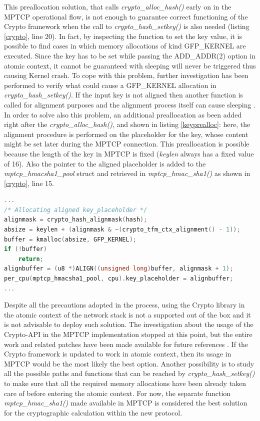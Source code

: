 This preallocation solution, that calls \textit{crypto\_alloc\_hash()} early on in the MPTCP operational flow, is not enough to guarantee correct functioning of the Crypto framework when the call to \textit{crypto\_hash\_setkey()} is also needed (listing \ref{crypto}, line 20). In fact, by inspecting the function to set the key value, it is possible to find cases in which memory allocations of kind GFP\_KERNEL are executed. Since the key has to be set while passing the ADD\_ADDR(2) option in atomic context, it cannot be guaranteed with sleeping will never be triggered thus causing Kernel crash. To cope with this problem, further investigation has been performed to verify what could cause a GFP\_KERNEL allocation in \textit{crypto\_hash\_setkey()}. If the input key is not aligned then another function \cite{shash61} is called for alignment purposes and the alignment process itself can cause sleeping \cite{shash43}. In order to solve also this problem, an additional preallocation as been added right after the  \textit{crypto\_alloc\_hash()}, and shown in listing \ref{keyprealloc}: here, the alignment procedure is performed on the placeholder for the key, whose content might be set later during the MPTCP connection. This preallocation is possible because the length of the key in MPTCP is fixed (\textit{keylen} always has a fixed value of 16).
Also the pointer to the aligned placeholder is added to the \textit{mptcp\_hmacsha1\_pool} struct and retrieved in \textit{mptcp\_hmac\_sha1()} as shown in \ref{crypto}, line 15. 

\begin{lstlisting}[language=c, caption=\textit{\textit{Preallocating an aligned placeholder for the HMAC key}}, label=keyprealloc]
...
/* Allocating aligned key_placeholder */
alignmask = crypto_hash_alignmask(hash);
absize = keylen + (alignmask & ~(crypto_tfm_ctx_alignment() - 1));
buffer = kmalloc(absize, GFP_KERNEL);
if (!buffer)
	return;
alignbuffer = (u8 *)ALIGN((unsigned long)buffer, alignmask + 1);
per_cpu(mptcp_hmacsha1_pool, cpu).key_placeholder = alignbuffer;
...
\end{lstlisting}

Despite all the precautions adopted in the process, using the Crypto library in the atomic context of the network stack is not a supported out of the box and it is not advisable to deploy such solution. The investigation about the usage of the Crypto-API in the MPTCP implementation stopped at this point, but the entire work and related patches have been made available for future references \cite{cryptopatch1} \cite{cryptopatch2}. If the Crypto framework is updated to work in atomic context, then its usage in MPTCP would be the most likely the best option. Another possibility is to study all the possible paths and functions that can be reached by \textit{crypto\_hash\_setkey()} to make sure that all the required memory allocations have been already taken care of before entering the atomic context. For now, the separate function \textit{mptcp\_hmac\_sha1()} made available in MPTCP is considered the best solution for the cryptographic calculation within the new protocol.

